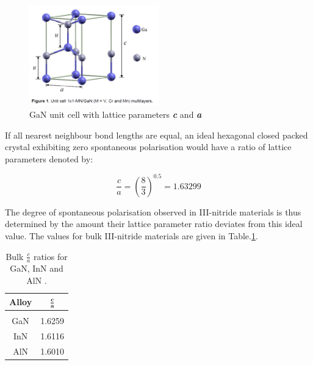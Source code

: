 \begin{figure}[h]
	\centering
	\includegraphics[width=0.5\textwidth]{Figs/Ch1/2unit.png}
	\caption {GaN unit cell with lattice parameters \textbf{\it c} and \textbf{\it a} \cite{Miguel2014}}
	\label{1.4}
\end{figure}
\FloatBarrier 

If all nearest neighbour bond lengths are equal, an ideal hexagonal closed packed crystal exhibiting zero spontaneous polarisation would have a ratio of lattice parameters denoted by:

\begin{equation}
\frac{c}{a}= (\frac{8}{3})^{0.5} = 1.63299
\end{equation} 

The degree of spontaneous polarisation observed in III-nitride materials is thus determined by the amount their lattice parameter ratio deviates from this ideal value. The values for bulk III-nitride materials are given in Table.\ref{tab1.3}. 

\begin{table}[!htb]
	\centering
	\label{tab1.1}
	\begin{tabular}{cc}
		\textbf{Alloy} &  $\mathbf{\frac{c}{a}}$ \\
		\hline\hline\\
		GaN   & 1.6259      \\
		InN   & 1.6116     \\
		AlN   & 1.6010   \\ 
		\hline
	\end{tabular}
	\caption{Bulk $\frac{c}{a}$ ratios for GaN, InN and AlN \cite{Ren2015}.}
	\label{tab1.3}
\end{table}

